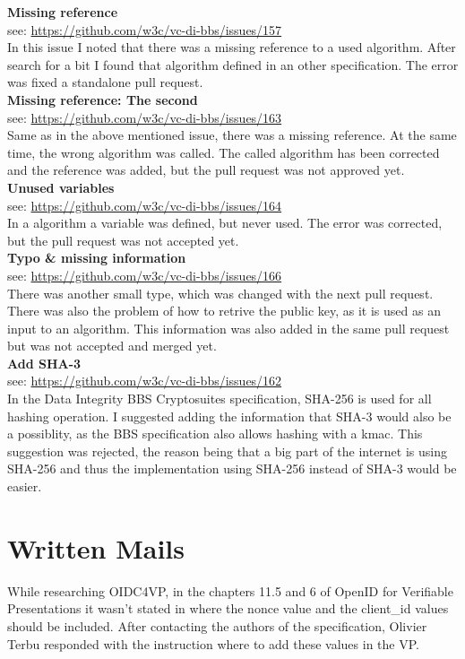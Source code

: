 \documentclass[
	a4paper               %
	,BCOR=0mm            %
	,bibliography=totoc   %
	,listof=totoc         %
	,monolingual
	,twoside=false
]{bfhthesis}              %
\begin{document}
\noindent
\textbf{Missing reference}\\
see: \url{https://github.com/w3c/vc-di-bbs/issues/157}\\
In this issue I noted that there was a missing reference to a used algorithm. After search for a bit I found that algorithm defined in an other specification. The error was fixed a standalone pull request.\\

\noindent
\textbf{Missing reference: The second}\\
see: \url{https://github.com/w3c/vc-di-bbs/issues/163}\\
Same as in the above mentioned issue, there was a missing reference. At the same time, the wrong algorithm was called. The called algorithm has been corrected and the reference was added, but the pull request was not approved yet.\\

\noindent
\textbf{Unused variables}\\
see: \url{https://github.com/w3c/vc-di-bbs/issues/164}\\
In a algorithm a variable was defined, but never used. The error was corrected, but the pull request was not accepted yet.\\

\noindent
\textbf{Typo \& missing information}\\
see: \url{https://github.com/w3c/vc-di-bbs/issues/166}\\
There was another small type, which was changed with the next pull request. There was also the problem of how to retrive the public key, as it is used as an input to an algorithm. This information was also added in the same pull request but was not accepted and merged yet.\\

\noindent
\textbf{Add SHA-3}\\
see: \url{https://github.com/w3c/vc-di-bbs/issues/162}\\
In the Data Integrity BBS Cryptosuites\cite{bbsvc} specification, SHA-256 is used for all hashing operation. I suggested adding the information that SHA-3 would also be a possiblity, as the BBS specification also allows hashing with a kmac. This suggestion was rejected, the reason being that a big part of the internet is using SHA-256 and thus the implementation using SHA-256 instead of SHA-3 would be easier.


\section{Written Mails}
While researching OIDC4VP, in the chapters 11.5 and 6 of OpenID for Verifiable Presentations\cite{oidc4vp} it wasn't stated in where the nonce value and the client\_id values should be included. After contacting the authors of the specification, Olivier Terbu responded with the instruction where to add these values in the VP.
\end{document}
